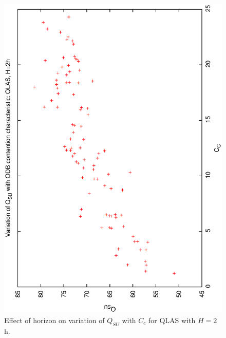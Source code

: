 \begin{figure}[h]

\begin{center}
 \includegraphics[scale=0.5, angle=-90]{figures/qsucc_ql2.eps}
 \caption[Effect of horizon on variation of $Q_{SU}$ with $C_c$ for QLAS with $H=2$h.] 
   {Effect of horizon on variation of $Q_{SU}$ with $C_c$ for QLAS with $H=2$h.} 
\label{fig:qsucc_ql2}
\end{center}
\end{figure}

